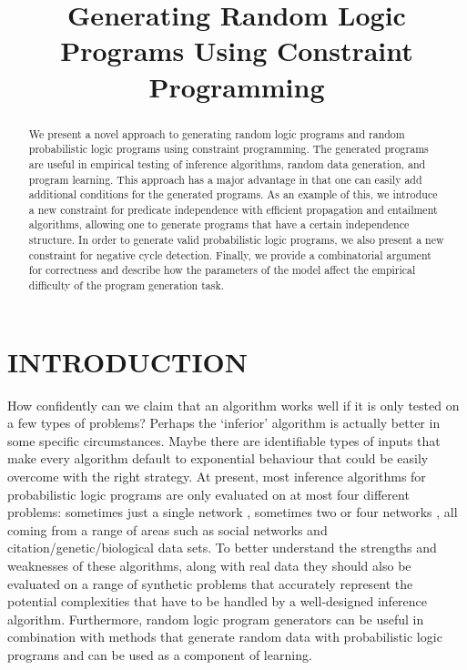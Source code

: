 \documentclass[letterpaper]{article}
\title{Generating Random Logic Programs Using Constraint Programming}
\author{}
\theoremstyle{definition}
\begin{document}

\maketitle

\begin{abstract}
  We present a novel approach to generating random logic programs and
  random probabilistic logic programs using constraint programming. The
  generated programs are useful in empirical testing of inference algorithms,
  random data generation, and program learning. This approach has a major
  advantage in that one can easily add additional conditions for the generated
  programs. As an example of this, we introduce a new constraint for predicate
  independence with efficient propagation and entailment algorithms, allowing
  one to generate programs that have a certain independence structure. In order
  to generate valid probabilistic logic programs, we also present a new
  constraint for negative cycle detection. Finally, we provide a combinatorial
  argument for correctness and describe how the parameters of the model affect
  the empirical difficulty of the program generation task.
\end{abstract}

\section{INTRODUCTION}

How confidently can we claim that an algorithm works well if it is only tested
on a few types of problems? Perhaps the `inferior' algorithm is actually
better in some specific circumstances. Maybe there are identifiable
types of inputs that make every algorithm default to exponential behaviour
that could be easily overcome with the right strategy. At present, most
inference algorithms for probabilistic logic programs are only evaluated on at
most four different problems: sometimes just a single network
\citep{DBLP:journals/tplp/KimmigDRCR11,DBLP:journals/corr/abs-1112-3785},
sometimes two
\citep{DBLP:journals/corr/abs-1009-3798,DBLP:conf/ecai/BruynoogheMKGVJR10} or
four networks \citep{DBLP:conf/ijcai/VlasselaerBKMR15}, all coming from a range
of areas such as social networks and citation/genetic/biological data sets. To
better understand the strengths and weaknesses of these algorithms, along with
real data they should also be evaluated on a range of synthetic problems that
accurately represent the potential complexities that have to be handled by a
well-designed inference algorithm. Furthermore, random logic program generators
can be useful in combination with methods that generate random data with
probabilistic logic programs \citep{DBLP:conf/soict/Dries15} and can be used as
a component of learning.
\end{document}
